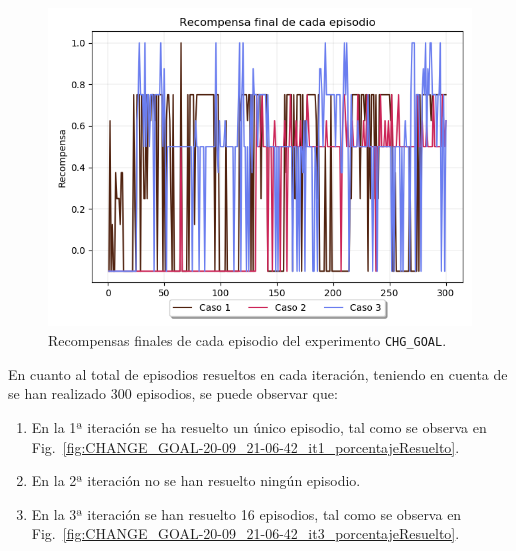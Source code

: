 \begin{figure}
    \centering
    \includegraphics[scale=0.4]{cap5_experimentacion/images/CHANGE_GOAL-20-09_21-06-42_recompensa.png}
    \caption{Recompensas finales de cada episodio del experimento \texttt{CHG\_GOAL}.}
    \label{fig:CHANGE_GOAL-20-09_21-06-42_recompensa}
\end{figure}

En cuanto al total de episodios resueltos en cada iteración, teniendo en cuenta de se han realizado 300 episodios, se puede observar que: 
\begin{enumerate}
    \item En la 1ª iteración se ha resuelto un único episodio, tal como se observa en Fig.~\ref{fig:CHANGE_GOAL-20-09_21-06-42_it1_porcentajeResuelto}.
    \item En la 2ª iteración no se han resuelto ningún episodio.
    \item En la 3ª iteración se han resuelto 16 episodios, tal como se observa en Fig.~\ref{fig:CHANGE_GOAL-20-09_21-06-42_it3_porcentajeResuelto}.
\end{enumerate}

